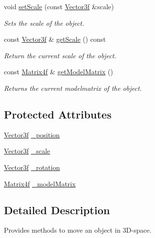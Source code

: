 \begin{DoxyCompactItemize}
void \hyperlink{classburn_1_1_transformable_a7e73a5706524923d4fc6c13990b7f575}{set\-Scale} (const \hyperlink{namespaceburn_afdd7cfb352b9612432faf6947b6fff74}{Vector3f} \&scale)
\begin{DoxyCompactList}\small\item\em Sets the scale of the object. \end{DoxyCompactList}\item 
const \hyperlink{namespaceburn_afdd7cfb352b9612432faf6947b6fff74}{Vector3f} \& \hyperlink{classburn_1_1_transformable_a62d533b4a7d03b3b2aa9c783cb7cb061}{get\-Scale} () const 
\begin{DoxyCompactList}\small\item\em Return the current scale of the object. \end{DoxyCompactList}\item 
const \hyperlink{namespaceburn_a643e9d2ffceb4304e3755a100268a7a3}{Matrix4f} \& \hyperlink{classburn_1_1_transformable_ac77cb89c24baf4eaf730b478b2f9b2b5}{get\-Model\-Matrix} ()
\begin{DoxyCompactList}\small\item\em Returns the current modelmatrix of the object. \end{DoxyCompactList}\end{DoxyCompactItemize}
\subsection*{Protected Attributes}
\begin{DoxyCompactItemize}
\item 
\hyperlink{namespaceburn_afdd7cfb352b9612432faf6947b6fff74}{Vector3f} \hyperlink{classburn_1_1_transformable_a1cb1a52f8518c7c2f50e45d8cd902767}{\-\_\-position}
\item 
\hyperlink{namespaceburn_afdd7cfb352b9612432faf6947b6fff74}{Vector3f} \hyperlink{classburn_1_1_transformable_a80e5ca4d02b2d58593b751b040e86492}{\-\_\-scale}
\item 
\hyperlink{namespaceburn_afdd7cfb352b9612432faf6947b6fff74}{Vector3f} \hyperlink{classburn_1_1_transformable_ad62e417f44d78cbeedfd30e62c1b896d}{\-\_\-rotation}
\item 
\hyperlink{namespaceburn_a643e9d2ffceb4304e3755a100268a7a3}{Matrix4f} \hyperlink{classburn_1_1_transformable_a6a06bcec86a7f2e70eba6fe7e8bbe61c}{\-\_\-model\-Matrix}
\end{DoxyCompactItemize}


\subsection{Detailed Description}
Provides methods to move an object in 3\-D-\/space. 


